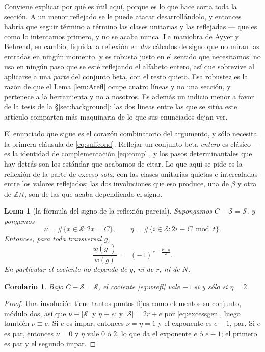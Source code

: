 \documentclass[11pt,reqno]{amsart}
\theoremstyle{plain}
\newtheorem{lemma}[theorem]{Lema}
\newtheorem{corollary}[theorem]{Corolario}
\theoremstyle{definition}
\newcommand{\ZZ}{\mathbb{Z}}
\begin{document}
Conviene explicar por qué es útil aquí, porque es lo que hace corta toda la sección. A un menor
reflejado se le puede atacar desarrollándolo, y entonces habría que seguir término a término las
clases unitarias y las reflejadas --- que es como lo intentamos primero, y no se acaba nunca. La
maniobra de Ayyer y Behrend, en cambio, liquida la reflexión en \emph{dos} cálculos de signo que no
miran las entradas en ningún momento, y es robusta justo en el sentido que necesitamos: no usa en
ningún paso que se esté reflejando el alfabeto entero, así que sobrevive al aplicarse a una
\emph{parte} del conjunto beta, con el resto quieto. Esa robustez es la razón de que el Lema
\ref{lem:Arefl} ocupe cuatro líneas y no una sección, y pertenece a la herramienta y no a nosotros.
Es además un indicio menor a favor de la tesis de la \S\ref{sec:background}: las dos líneas entre las
que se sitúa este artículo comparten más maquinaria de lo que sus enunciados dejan ver.

El enunciado que sigue es el corazón combinatorio del argumento, y sólo necesita la primera cláusula
de \eqref{eq:suffcond}. Reflejar un conjunto beta \emph{entero} es clásico --- es la identidad de
complementación \eqref{eq:compl}, y los pasos determinantales que hay detrás son los estándar que
acabamos de citar. Lo que aquí se pide es la reflexión de la parte de exceso \emph{sola}, con las
clases unitarias quietas e intercaladas entre los valores reflejados; las dos involuciones que eso
produce, una de $\beta$ y otra de $\ZZ/t$, son de las que acaba dependiendo el signo.

\begin{lemma}[la fórmula del signo de la reflexión parcial]\label{lem:signformula}
Supongamos $C-\mathcal{S}=\mathcal{S}$, y pongamos
\[
\nu=\#\{x\in\mathcal{S}:2x=C\},\qquad \eta=\#\{i\in\mathcal{E}:2i\equiv C \bmod t\}.
\]
Entonces, para toda transversal $g$,
\begin{equation}\label{eq:wrefl}
\frac{w(g^{\dagger})}{w(g)}\;=\;(-1)^{\,e-\frac{\nu+\eta}{2}} .
\end{equation}
En particular el cociente no depende de $g$, ni de $r$, ni de $N$.
\end{lemma}

\begin{corollary}\label{cor:whenminus}
Bajo $C-\mathcal{S}=\mathcal{S}$, el cociente \eqref{eq:wrefl} vale $-1$ si y sólo si $\eta=2$.
\end{corollary}

\begin{proof}
Una involución tiene tantos puntos fijos como elementos su conjunto, módulo dos, así que
$\nu\equiv|\mathcal{S}|$ y $\eta\equiv e$; y $|\mathcal{S}|=2r+e$ por \eqref{eq:excessgen}, luego
también $\nu\equiv e$. Si $e$ es impar, entonces $\nu=\eta=1$ y el exponente es $e-1$, par. Si $e$ es
par, entonces $\nu=0$ y $\eta$ vale $0$ ó $2$, lo que da el exponente $e$ ó $e-1$; el primero es par y
el segundo impar.
\end{proof}
\end{document}
